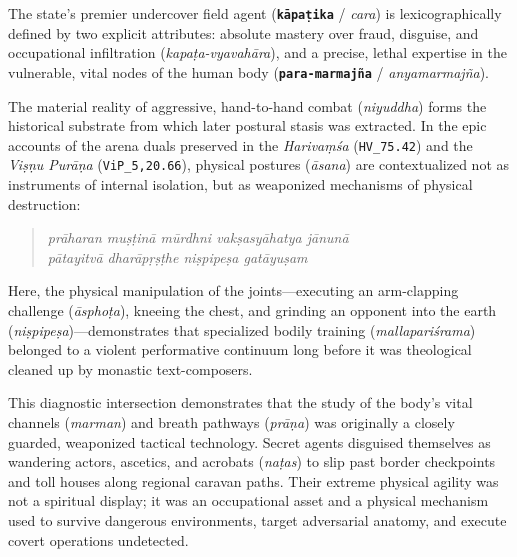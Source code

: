 \documentclass[11pt,letterpaper]{article}
\begin{document}
The state's premier undercover field agent (\textbf{\texttt{kāpaṭika}} / \textit{cara}) is lexicographically defined by two explicit attributes: absolute mastery over fraud, disguise, and occupational infiltration (\textit{kapaṭa-vyavahāra}), and a precise, lethal expertise in the vulnerable, vital nodes of the human body (\textbf{\texttt{para-marmajña}} / \textit{anyamarmajña}). 

The material reality of aggressive, hand-to-hand combat (\textit{niyuddha}) forms the historical substrate from which later postural stasis was extracted. In the epic accounts of the arena duals preserved in the \textit{Harivaṃśa} (\texttt{HV\_75.42}) and the \textit{Viṣṇu Purāṇa} (\texttt{ViP\_5,20.66}), physical postures (\textit{āsana}) are contextualized not as instruments of internal isolation, but as weaponized mechanisms of physical destruction:
\begin{quotation}
\noindent \textit{prāharan muṣṭinā mūrdhni vakṣasyāhatya jānunā} \\
\noindent \textit{pātayitvā dharāpṛṣṭhe niṣpipeṣa gatāyuṣam}
\end{quotation}
Here, the physical manipulation of the joints---executing an arm-clapping challenge (\textit{āsphoṭa}), kneeing the chest, and grinding an opponent into the earth (\textit{niṣpipeṣa})---demonstrates that specialized bodily training (\textit{mallapariśrama}) belonged to a violent performative continuum long before it was theological cleaned up by monastic text-composers.


This diagnostic intersection demonstrates that the study of the body's vital channels (\textit{marman}) and breath pathways (\textit{prāṇa}) was originally a closely guarded, weaponized tactical technology. Secret agents disguised themselves as wandering actors, ascetics, and acrobats (\textit{naṭas}) to slip past border checkpoints and toll houses along regional caravan paths. Their extreme physical agility was not a spiritual display; it was an occupational asset and a physical mechanism used to survive dangerous environments, target adversarial anatomy, and execute covert operations undetected.
\end{document}

